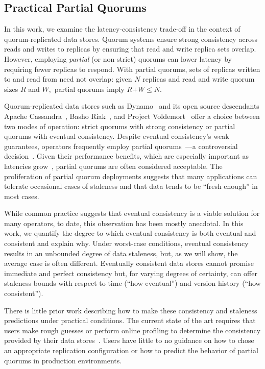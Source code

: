 \documentclass{vldb}
\begin{document}
\subsection{Practical Partial Quorums}

In this work, we examine the latency-consistency trade-off in the context of
quorum-replicated data stores. Quorum systems ensure
strong consistency across reads and writes to replicas by ensuring
that read and write replica sets overlap. However, employing
\textit{partial} (or non-strict) quorums can lower latency by
requiring fewer replicas to respond.  With partial quorums, sets of
replicas written to and read from need not overlap: given $N$ replicas
and read and write quorum sizes $R$ and $W,$ partial quorums imply
$R$$+$$W$$\leq$$N$.

Quorum-replicated data stores such as Dynamo~\cite{dynamo} and its
open source descendants Apache Cassandra~\cite{cassandra-sigmod},
Basho Riak~\cite{riak}, and Project Voldemort~\cite{voldemortpub}
offer a choice between two modes of operation: strict quorums with
strong consistency or partial quorums with eventual
consistency. Despite eventual consistency's weak guarantees, operators
frequently employ partial quorums~\cite{cassandra-docs,
  cassandradefault,feinbergpc,reddit, outbrain, maxperfblog}---a
controversial decision~\cite{hamilton-cap, cops, walter, urbanmyths}.
Given their performance benefits, which are especially important as
latencies grow~\cite{abadilatconsist, feinbergpc, hamilton-cap,
  helland}, partial quorums are often considered acceptable.  The proliferation
of partial quorum deployments suggests that many applications can
tolerate occasional cases of staleness and that data tends to be
``fresh enough'' in most cases.

While common practice suggests that eventual consistency is a
viable solution for many operators, to date, this observation has been
mostly anecdotal. In this work, we quantify the degree to which
eventual consistency is both eventual and consistent and explain
why. Under worst-case conditions, eventual consistency results in an
unbounded degree of data staleness, but, as we will show, the average
case is often different.  Eventually consistent data stores cannot
promise immediate and perfect consistency but, for varying degrees of
certainty, can offer staleness bounds with respect to time (``how
eventual'') and version history (``how consistent'').

There is little prior work describing how to make these consistency
and staleness predictions under practical conditions.  The current
state of the art requires that users make rough guesses or perform
online profiling to determine the consistency provided by their data
stores~\cite{measure-consistency, podc-hpl, consistency-cidr}. Users
have little to no guidance on how to chose an appropriate
replication configuration or how to predict the behavior of partial
quorums in production environments.
\end{document}
